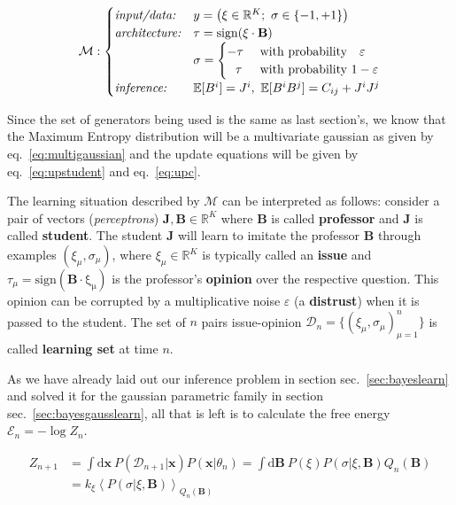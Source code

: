 \documentclass[12pt,a4paperpaper,]{tufte-book}
\begin{document}
\begin{equation}
\mathcal{M}: \begin{cases}
    \emph{input/data:}  & y = \left( \xi \in \mathbb{R}^K;\ \sigma \in \{ -1, +1 \} \right) \\
    \emph{architecture:}& \tau = \mathrm{sign} (\xi \cdot \mathbf{B}) \\
                        & \sigma = 
    \begin{cases} -\tau\ &\text{with probability}\ \ \ \varepsilon \\ 
    \ \ \tau\vphantom{\frac{0}{0}}\ &\text{with probability}\ 1 - \varepsilon 
    \end{cases} \\
\emph{inference:}& \mathbb{E}[B^{i}] = J^{i},\  \mathbb{E}[B^{i}B^{j}] = C_{ij} + J^{i}J^{j}
\end{cases}
\label{eq:model}\end{equation}

Since the set of generators being used is the same as last section's, we know that the Maximum Entropy distribution will be a multivariate gaussian as given by eq.~\ref{eq:multigaussian} and the update equations will be given by eq.~\ref{eq:upstudent} and eq.~\ref{eq:upc}.

The learning situation described by \(\mathcal{M}\) can be interpreted as follows: consider a pair of vectors (\emph{perceptrons}) \(\mathbf{J}, \mathbf{B}\in \mathbb{R}^K\) where \(\mathbf{B}\) is called \textbf{professor} and \(\mathbf{J}\) is called \textbf{student}. The student \(\mathbf{J}\) will learn to imitate the professor \(\mathbf{B}\) through examples \((\xi_\mu, \sigma_\mu)\), where \(\xi_\mu \in \mathbb{R}^K\) is typically called an \textbf{issue} and \(\tau_\mu = \mathrm{sign(\mathbf{B}\cdot \xi_\mu)}\) is the professor's \textbf{opinion} over the respective question. This opinion can be corrupted by a multiplicative noise \(\varepsilon\) (a \textbf{distrust}) when it is passed to the student. The set of \(n\) pairs issue-opinion \(\mathcal{D}_n = \{ (\xi_\mu, \sigma_\mu)_{\mu=1}^n \}\) is called \textbf{learning set} at time \(n\).

As we have already laid out our inference problem in section sec.~\ref{sec:bayeslearn} and solved it for the gaussian parametric family in section sec.~\ref{sec:bayesgausslearn}, all that is left is to calculate the free energy \(\mathcal{E}_n = - \log Z_n\).

\begin{align}
     Z_{n+1} &= \int \mathrm{d}\mathbf{x}\ P(\mathcal{D}_{n+1}| \mathbf{x}) P(\mathbf{x}| \theta_n) = \int \mathrm{d}\mathbf{B}\ P(\xi) P(\sigma| \xi, \mathbf{B}) Q_n(\mathbf{B}) \\
    & = k_\xi \left\langle P(\sigma| \xi, \mathbf{B}) \right\rangle_{Q_n(\mathbf{B})}
\end{align}
\end{document}
